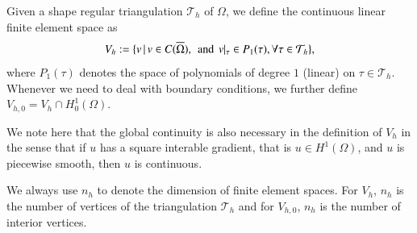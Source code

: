Given a shape regular triangulation $\mathcal T_h$ of $\Omega$, we define the 
continuous linear finite element space as 
\begin{equation}\label{LinFE}
V_h:=\{v\,|\, v\in C(\overline \Omega), \,\hbox{ and }\, v|_{\tau}\in
P_1(\tau), \forall \tau \in \mathcal T_h\},
\end{equation}
where $P_1(\tau)$ denotes the space of polynomials of degree $1$
(linear) on $\tau\in \mathcal T_h$. Whenever we need to deal with boundary
conditions, we further define $V_{h,0}=V_h\cap H_0^1(\Omega)$.

We note here that the global continuity is also necessary in the
definition of $V_h$ in the sense that if $u$ has a square interable
gradient, that is $u\in H^1(\Omega)$, and $u$ is piecewise smooth,
then $u$ is continuous. 

We always use $n_h$ to denote the dimension of finite element
spaces. For $V_h$, $n_h$ is the number of vertices of the
triangulation $\mathcal T_h$ and for $V_{h,0}$, $n_h$ is the number of
interior vertices. 

